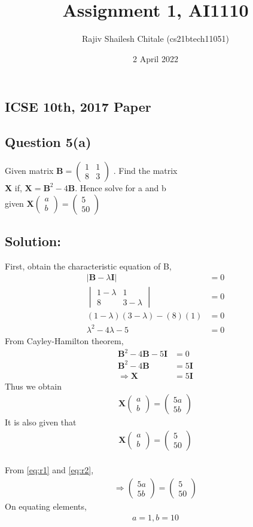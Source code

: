 \documentclass[journal,12pt,twocolumn]{IEEEtran}
\title{Assignment 1, AI1110}
\author{Rajiv Shailesh Chitale (cs21btech11051)}
\date{2 April 2022}
\newcommand{\myvec}[1]{\ensuremath{\begin{pmatrix}#1\end{pmatrix}}}
\newcommand{\mydet}[1]{\ensuremath{\begin{vmatrix}#1\end{vmatrix}}}
\let\vec\mathbf
\begin{document}
\maketitle

\subsection*{\textbf{ICSE 10th, 2017 Paper}}
\subsection*{\textbf{Question 5(a)}}
    Given matrix $\vec{B} = \myvec{ 1 & 1 \\8 & 3}$
    . Find the matrix 
    \\
    \textbf{X} if,  $\vec{X} = \vec{B}^2 -4\vec{B}$. Hence solve for a and b
    \\
    given $\vec{X} \myvec{a \\ b}
    = \myvec{5\\50} $
\subsection*{\textbf{Solution:}}
    First, obtain the characteristic equation of B,
    \begin{align}
        |\vec{B}-\lambda \vec{I}| &= 0 
        \\
        \mydet{1-\lambda & 1\\ 8 & 3-\lambda} &= 0 
        \\
        (1-\lambda)(3-\lambda)-(8)(1) &= 0
        \\
        \lambda ^2 - 4\lambda -5 &= 0
    \end{align}
        From Cayley-Hamilton theorem,
    \begin{align} 
        \vec{B}^2 -4\vec{B} - 5\vec{I} &= 0
        \\
        \vec{B}^2 -4\vec{B} &= 5\vec{I}
        \\
        \Rightarrow \vec{X} &= 5\vec{I}
    \end{align}
    Thus we obtain
    \begin{align}\vec{X}
        \label{eq:r1}
        \myvec{a \\ b} = \myvec{5a \\ 5b} 
    \end{align}
    It is also given that
    \begin{align}
        \label{eq:r2}
        \vec{X} \myvec{a \\ b} = \myvec{5 \\ 50}
    \end{align}
    \\
    From \eqref{eq:r1} and \eqref{eq:r2},
    \begin{align} \Rightarrow 
        \myvec{5a \\ 5b} =\myvec{5 \\ 50} 
    \end{align}
    On equating elements,
    \begin{align}
        a = 1 , b = 10
    \end{align}
    
\end{document}
